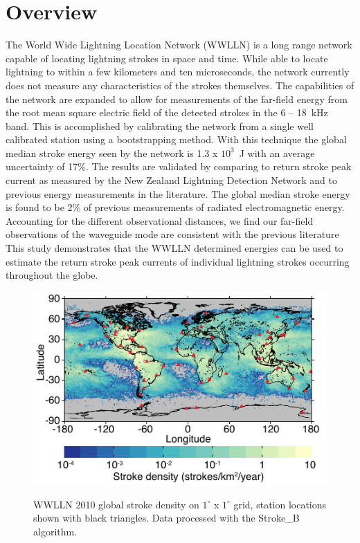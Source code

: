 \section{Overview}

The World Wide Lightning Location Network (WWLLN) is a long range network capable of locating lightning strokes in space and time.
While able to locate lightning to within a few kilometers and ten microseconds, the network currently does not measure any characteristics of the strokes themselves.
The capabilities of the network are expanded to allow for measurements of the far-field energy from the root mean square electric field of the detected strokes in the 6 -- 18~kHz band.
This is accomplished by calibrating the network from a single well calibrated station using a bootstrapping method.
With this technique the global median stroke energy seen by the network is 1.3 x $10^3$~J with an average uncertainty of 17\%.
The results are validated by comparing to return stroke peak current as measured by the New Zealand Lightning Detection Network and to previous energy measurements in the literature.
The global median stroke energy is found to be 2\% of previous measurements of radiated electromagnetic energy.
Accounting for the different observational distances, we find our far-field observations of the waveguide mode are consistent with the previous literature
This study demonstrates that the WWLLN determined energies can be used to estimate the return stroke peak currents of individual lightning strokes occurring throughout the globe.

\begin{figure}[ht!]
\centering
\includegraphics[scale=1.5]{energy/Figures/PPS_WWLLN_2010.pdf}\\
\caption{WWLLN 2010 global stroke density on $1^\circ$ x $1^\circ$ grid, station locations shown with black triangles. Data processed with the Stroke\_B algorithm.}
\label{energy:fig:wwlln_dist}
\end{figure}

